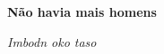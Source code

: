 


\begingroup\thispagestyle{empty}\vspace*{.05\textheight} 

              \formular
              \huge
              \noindent
              \textbf{Não havia mais homens}
              
              \vspace{0.3em}

              \noindent\large\textit{Imbodn oko taso}
                    
\endgroup
\vfill
\pagebreak